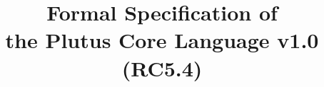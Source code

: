 \documentclass[conference]{IEEEtran}
\begin{document}
%
\title{Formal Specification of\\the Plutus Core Language v1.0 (RC5.4)}











% 








\maketitle
\end{document}
